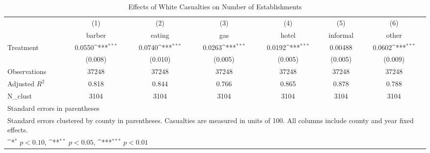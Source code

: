 \begin{table}[htbp]\centering
\def\sym#1{\ifmmode^{#1}\else\(^{#1}\)\fi}
\caption{Effects of White Casualties on Number of Establishments}
\begin{tabular}{l*{6}{c}}
\hline\hline
                    &\multicolumn{1}{c}{(1)}&\multicolumn{1}{c}{(2)}&\multicolumn{1}{c}{(3)}&\multicolumn{1}{c}{(4)}&\multicolumn{1}{c}{(5)}&\multicolumn{1}{c}{(6)}\\
                    &\multicolumn{1}{c}{barber}&\multicolumn{1}{c}{eating}&\multicolumn{1}{c}{gas}&\multicolumn{1}{c}{hotel}&\multicolumn{1}{c}{informal}&\multicolumn{1}{c}{other}\\
\hline
Treatment           &      0.0550\sym{***}&      0.0740\sym{***}&      0.0263\sym{***}&      0.0192\sym{***}&     0.00488         &      0.0602\sym{***}\\
                    &     (0.008)         &     (0.010)         &     (0.005)         &     (0.005)         &     (0.005)         &     (0.009)         \\
\hline
Observations        &       37248         &       37248         &       37248         &       37248         &       37248         &       37248         \\
Adjusted \(R^{2}\)  &       0.818         &       0.844         &       0.766         &       0.865         &       0.878         &       0.788         \\
N\_clust             &        3104         &        3104         &        3104         &        3104         &        3104         &        3104         \\
\hline\hline
\multicolumn{7}{l}{\footnotesize Standard errors in parentheses}\\
\multicolumn{7}{l}{\footnotesize Standard errors clustered by county in parentheses.         Casualties are measured in units of 100.          All columns include county and year fixed effects.}\\
\multicolumn{7}{l}{\footnotesize \sym{*} \(p<0.10\), \sym{**} \(p<0.05\), \sym{***} \(p<0.01\)}\\
\end{tabular}
\end{table}
